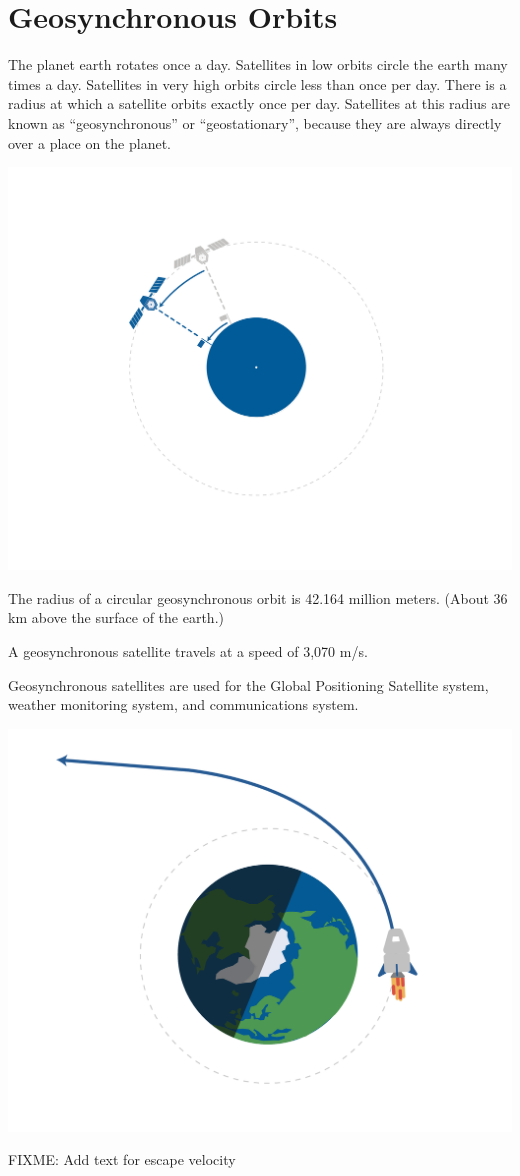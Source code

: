 \section{Geosynchronous Orbits}

The planet earth rotates once a day.  Satellites in low orbits circle
the earth many times a day. Satellites in very high orbits circle
less than once per day. There is a radius at which a satellite orbits
exactly once per day.  Satellites at this radius are known as
``geosynchronous'' or ``geostationary'', because they are always
directly over a place on the planet.

\includegraphics[width=.75\textwidth]{geoSync.png}

The radius of a circular geosynchronous orbit is 42.164 million
meters. (About 36 km above the surface of the earth.)

A geosynchronous satellite travels at a speed of 3,070 m/s.

Geosynchronous satellites are used for the Global Positioning
Satellite system, weather monitoring system, and communications
system.

\includegraphics[width=.75\textwidth]{escape.png}

FIXME: Add text for escape velocity




